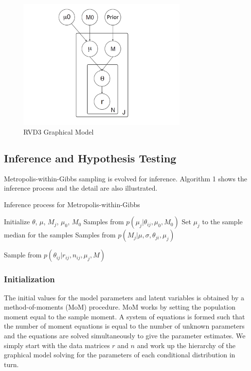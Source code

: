 \documentclass{bioinfo}
\begin{document}
\begin{figure}[h]
\begin{center}
\includegraphics[width=85mm]{figs/RVD3_model.pdf}
\caption{RVD3 Graphical Model}
\label{fig:graphical_model}
\end{center}
\end{figure}


\subsection{Inference and Hypothesis Testing}

Metropolis-within-Gibbs sampling is evolved for inference. Algorithm 1 shows the inference process and the detail are also illustrated.

\begin{algorithm}[ht]
\caption{Inference process for Metropolis-within-Gibbs}
\label{alg:metro_gibbs}
\begin{algorithmic}[1]

\State Initialize $\theta$, $\mu$, $M_j$, $\mu_0$, $M_0$
\Repeat
{}
  \State Samples from $p \left( \mu_j |\theta_{ij},\mu_0,M_0\right)$ 
  \State Set $\mu_j$ to the sample median for the samples
  \State Samples from $p \left( M_{j} |\mu,\sigma, \theta_{ji},\mu_j\right)$ 

	\State Sample from $p \left( \theta_{ij} |r_{ij},n_{ij},\mu_j,M \right)$ 
  \EndFor

\EndFor
{}
\end{algorithmic}
\end{algorithm}

\subsubsection{Initialization}
The initial values for the model parameters and latent variables is obtained by a method-of-moments (MoM) procedure. MoM works by setting the population moment equal to the sample moment.
A system of equations is formed such that the number of moment equations is equal to the number of unknown parameters and the equations are solved simultaneously to give the parameter estimates.
We simply start with the data matrices $r$ and $n$ and work up the hierarchy of the graphical model solving for the parameters of each conditional distribution in turn.
\end{document}
